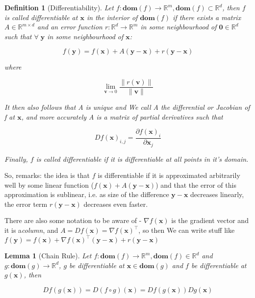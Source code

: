 \documentclass{article}
\newtheorem{definition}[theorem]{Definition}
\newtheorem{lemma}[theorem]{Lemma}
\begin{document}
		\begin{definition}[Differentiability]
			Let $f:\mathbf{dom}(f)\to\mathbb{R}^m, \mathbf{dom}(f)\subset\mathbb{R}^d$, then $f$ is called \textnormal{differentiable} at $\mathbf{x}$ in the interior of $\mathbf{dom}(f)$ if there exists a matrix $A\in\mathbb{R}^{m\times d}$ and an error function $r:\mathbb{R}^d\to\mathbb{R}^m$ in some neighbourhood of $\mathbf{0}\in\mathbb{R}^d$ such that $\forall\;\mathbf{y}$ in some neighbourhood of $\mathbf{x}$:
			
			\[ f(\mathbf{y}) = f(\mathbf{x}) + A(\mathbf{y-x}) + r(\mathbf{y-x}) \]
			
			where
			
			\[ \lim_{\mathbf{v}\to 0} \frac{\|r(\mathbf{v})\|}{\|\mathbf{v}\|} \]
			
			It then also follows that A is unique and We call A the \textnormal{differential} or \textnormal{Jacobian} of f at $\mathbf{x}$, and more accurately A is a matrix of partial derivatives such that
			
			\[ Df(\mathbf{x})_{i, j} = \frac{\partial f(\mathbf{x})_i}{\partial \mathbf{x}_j} \]
			
			Finally, $f$ is called \textnormal{differentiable} if it is differentiable at all points in it's domain. 
		\end{definition}
		
		So, remarks: the idea is that $f$ is differentiable if it is approximated arbitrarily well by some linear function ($f(\mathbf{x}) + A(\mathbf{y-x})$) and that the error of this approximation is sublinear, i.e. as size of the difference $\mathbf{y-x}$ decreases linearly, the error term $r(\mathbf{y-x})$ decreases even faster.
		
		There are also some notation to be aware of - $\nabla f(\mathbf{x})$ is the gradient vector and it is a\textit{column}, and $A = Df(\mathbf{x}) = \nabla f(\mathbf{x})^\top$, so then We can write stuff like $f(\mathbf{y}) = f(\mathbf{x}) + \nabla f(\mathbf{x})^\top(\mathbf{y-x}) + r(\mathbf{y-x})$
		
		\begin{lemma}[Chain Rule]
			Let $f:\mathbf{dom}(f)\to\mathbb{R}^m,\mathbf{dom}(f)\in\mathbb{R}^d$ and  $g:\mathbf{dom}(g)\to\mathbb{R}^d$, $g$ be differentiable at $\mathbf{x}\in\mathbf{dom}(g)$ and $f$ be differentiable at $g(\mathbf{x})$, then
			
			\[Df(g(\mathbf{x})) = D(f\circ g)(\mathbf{x}) = Df(g(\mathbf{x}))Dg(\mathbf{x}) \]
		\end{lemma}
		
\end{document}
